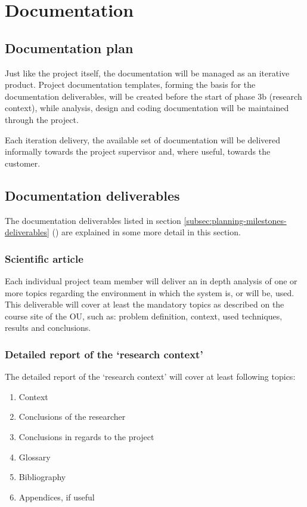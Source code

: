 
\section{Documentation}
\label{sec:documentation}
\subsection{Documentation plan}
Just like the project itself, the documentation will be managed as an iterative product.
Project documentation templates, forming the basis for the documentation deliverables, will be created before the start of phase 3b (research context), while analysis, design and coding documentation will be maintained through the project.

Each iteration delivery, the available set of documentation will be delivered informally towards the project supervisor and, where useful, towards the customer.

\subsection{Documentation deliverables}
The documentation deliverables listed in section \ref{subsec:planning-milestones-deliverables} () are explained in some more detail in this section.

\subsubsection{Scientific article}
Each individual project team member will deliver an in depth analysis of one or more topics regarding the environment in which the system is, or will be, used.
This deliverable will cover at least the mandatory topics as described on the course site of the OU, such as: problem definition, context, used techniques, results and conclusions.

\subsubsection{Detailed report of the `research context'}
The detailed report of the `research context' will cover at least following topics:

	\begin{enumerate}
		\item Context
		\item Conclusions of the researcher
		\item Conclusions in regards to the project
		\item Glossary
		\item Bibliography
		\item Appendices, if useful
	\end {enumerate}

